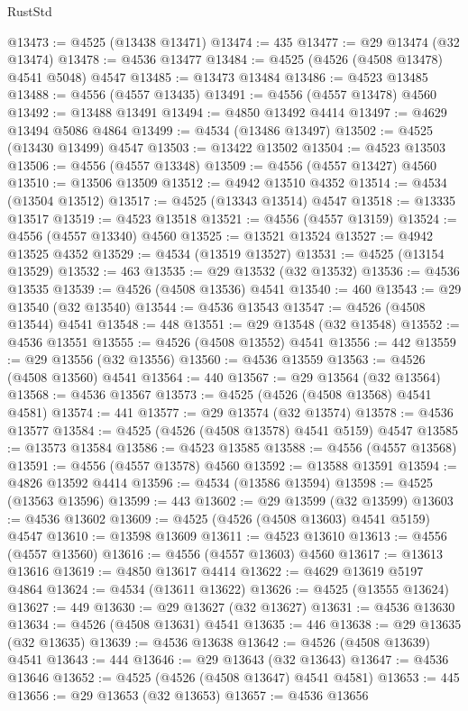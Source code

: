\begin{lexlean}{RustStd}
\begin{coremodule}
{\begin{coremodule}
{{{{{{{{{{{{{{{{{{{{{{{{{{{{{{{{{{{{{{{{{{{{{{{{{{{{{{{@13473 := @4525 (@13438 @13471)
@13474 := 435
@13477 := @29 @13474 (@32 @13474)
@13478 := @4536 @13477
@13484 := @4525 (@4526 (@4508 @13478) @4541 @5048) @4547
@13485 := @13473 @13484
@13486 := @4523 @13485
@13488 := @4556 (@4557 @13435)
@13491 := @4556 (@4557 @13478) @4560
@13492 := @13488 @13491
@13494 := @4850 @13492 @4414
@13497 := @4629 @13494 @5086 @4864
@13499 := @4534 (@13486 @13497)
@13502 := @4525 (@13430 @13499) @4547
@13503 := @13422 @13502
@13504 := @4523 @13503
@13506 := @4556 (@4557 @13348)
@13509 := @4556 (@4557 @13427) @4560
@13510 := @13506 @13509
@13512 := @4942 @13510 @4352
@13514 := @4534 (@13504 @13512)
@13517 := @4525 (@13343 @13514) @4547
@13518 := @13335 @13517
@13519 := @4523 @13518
@13521 := @4556 (@4557 @13159)
@13524 := @4556 (@4557 @13340) @4560
@13525 := @13521 @13524
@13527 := @4942 @13525 @4352
@13529 := @4534 (@13519 @13527)
@13531 := @4525 (@13154 @13529)
@13532 := 463
@13535 := @29 @13532 (@32 @13532)
@13536 := @4536 @13535
@13539 := @4526 (@4508 @13536) @4541
@13540 := 460
@13543 := @29 @13540 (@32 @13540)
@13544 := @4536 @13543
@13547 := @4526 (@4508 @13544) @4541
@13548 := 448
@13551 := @29 @13548 (@32 @13548)
@13552 := @4536 @13551
@13555 := @4526 (@4508 @13552) @4541
@13556 := 442
@13559 := @29 @13556 (@32 @13556)
@13560 := @4536 @13559
@13563 := @4526 (@4508 @13560) @4541
@13564 := 440
@13567 := @29 @13564 (@32 @13564)
@13568 := @4536 @13567
@13573 := @4525 (@4526 (@4508 @13568) @4541 @4581)
@13574 := 441
@13577 := @29 @13574 (@32 @13574)
@13578 := @4536 @13577
@13584 := @4525 (@4526 (@4508 @13578) @4541 @5159) @4547
@13585 := @13573 @13584
@13586 := @4523 @13585
@13588 := @4556 (@4557 @13568)
@13591 := @4556 (@4557 @13578) @4560
@13592 := @13588 @13591
@13594 := @4826 @13592 @4414
@13596 := @4534 (@13586 @13594)
@13598 := @4525 (@13563 @13596)
@13599 := 443
@13602 := @29 @13599 (@32 @13599)
@13603 := @4536 @13602
@13609 := @4525 (@4526 (@4508 @13603) @4541 @5159) @4547
@13610 := @13598 @13609
@13611 := @4523 @13610
@13613 := @4556 (@4557 @13560)
@13616 := @4556 (@4557 @13603) @4560
@13617 := @13613 @13616
@13619 := @4850 @13617 @4414
@13622 := @4629 @13619 @5197 @4864
@13624 := @4534 (@13611 @13622)
@13626 := @4525 (@13555 @13624)
@13627 := 449
@13630 := @29 @13627 (@32 @13627)
@13631 := @4536 @13630
@13634 := @4526 (@4508 @13631) @4541
@13635 := 446
@13638 := @29 @13635 (@32 @13635)
@13639 := @4536 @13638
@13642 := @4526 (@4508 @13639) @4541
@13643 := 444
@13646 := @29 @13643 (@32 @13643)
@13647 := @4536 @13646
@13652 := @4525 (@4526 (@4508 @13647) @4541 @4581)
@13653 := 445
@13656 := @29 @13653 (@32 @13653)
@13657 := @4536 @13656
}}}}}}}}}}}}}}}}}}}}}}}}}}}}}}}}}}}}}}}}}}}}}}}}}}}}}}}
\end{coremodule}}
\end{coremodule}
\end{lexlean}
